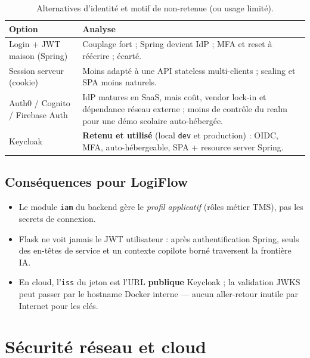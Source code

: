 \begin{table}[H]
\centering
\caption{Alternatives d'identité et motif de non-retenue (ou usage limité).}
\label{tab:auth-alt}
\small
\begin{tabularx}{\linewidth}{@{}l X@{}}
\toprule
Option & Analyse \\
\midrule
Login + JWT maison (Spring) &
  Couplage fort ; Spring devient IdP ; MFA et reset à réécrire ; écarté. \\
Session serveur (cookie) &
  Moins adapté à une API stateless multi-clients ; scaling et SPA moins naturels. \\
Auth0 / Cognito / Firebase Auth &
  IdP matures en SaaS, mais coût, vendor lock-in et dépendance réseau externe ;
  moins de contrôle du realm pour une démo scolaire auto-hébergée. \\
Keycloak &
  \textbf{Retenu et utilisé} (local \texttt{dev} et production) :
  OIDC, MFA, auto-hébergeable, SPA + resource server Spring. \\
\bottomrule
\end{tabularx}
\end{table}


\subsection{Conséquences pour LogiFlow}

\begin{itemize}[leftmargin=*]
  \item Le module \texttt{iam} du backend gère le \emph{profil applicatif} (rôles métier TMS),
        pas les secrets de connexion.
  \item Flask ne voit jamais le JWT utilisateur : après authentification Spring, seuls des
        en-têtes de service et un contexte copilote borné traversent la frontière IA.
  \item En cloud, l'\texttt{iss} du jeton est l'URL \textbf{publique} Keycloak ; la validation
        JWKS peut passer par le hostname Docker interne --- aucun aller-retour inutile par Internet
        pour les clés.
\end{itemize}

\section{Sécurité réseau et cloud}

